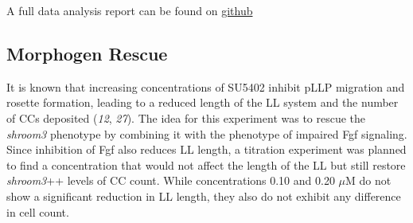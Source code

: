 \documentclass[11pt,singlespacinge,twoside]{reedthesis} %
\begin{document}
A full data analysis report can be found on \href{https://github.com/KleinhansDa/reports/blob/master/b7a875fc1ea228b9061041b7cec4bd3c52ab3ce3/clusters_hsshrm3.html}{github}

\hypertarget{morphogen-rescue}{%
\subsection{Morphogen Rescue}\label{morphogen-rescue}}

It is known that increasing concentrations of SU5402 inhibit pLLP migration and rosette formation, leading to a reduced length of the LL system and the number of CCs deposited (\emph{12}, \emph{27}).
The idea for this experiment was to rescue the \emph{shroom3} phenotype by combining it with the phenotype of impaired Fgf signaling. Since inhibition of Fgf also reduces LL length, a titration experiment was planned to find a concentration that would not affect the length of the LL but still restore \emph{shroom3}++ levels of CC count. While concentrations 0.10 and 0.20 \(\mu\)M do not show a significant reduction in LL length, they also do not exhibit any difference in cell count.\newline
\end{document}
